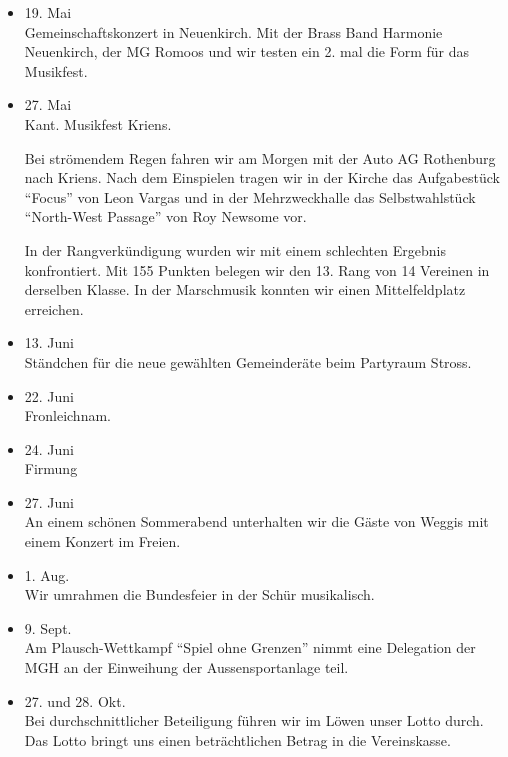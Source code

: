 \begin{history}
\begin{itemize}
        \item[]19. Mai\\
        Gemeinschaftskonzert in Neuenkirch. Mit der Brass Band Harmonie
        Neuenkirch, der MG Romoos und wir testen ein 2. mal die Form für das
        Musikfest.

        \item[]27. Mai\\
        Kant. Musikfest Kriens.

        Bei strömendem Regen fahren wir am Morgen mit der Auto AG Rothenburg
        nach Kriens. Nach dem Einspielen tragen wir in der Kirche das
        Aufgabestück \enquote{Focus} von Leon Vargas und in der Mehrzweckhalle
        das Selbstwahlstück \enquote{North-West Passage} von Roy Newsome vor.

        In der Rangverkündigung wurden wir mit einem schlechten Ergebnis
        konfrontiert. Mit 155 Punkten belegen wir den 13. Rang von 14 Vereinen
        in derselben Klasse. In der Marschmusik konnten wir einen
        Mittelfeldplatz erreichen.

        \item[]13. Juni\\
        Ständchen für die neue gewählten Gemeinderäte beim Partyraum Stross.

        \item[]22. Juni\\
        Fronleichnam.

        \item[]24. Juni\\
        Firmung

        \item[]27. Juni\\
        An einem schönen Sommerabend unterhalten wir die Gäste von Weggis mit
        einem Konzert im Freien.

        \item[]1. Aug.\\
        Wir umrahmen die Bundesfeier in der Schür musikalisch.

        \item[]9. Sept.\\
        Am Plausch-Wettkampf \enquote{Spiel ohne Grenzen} nimmt eine Delegation
        der MGH an der Einweihung der Aussensportanlage teil.

        \item[]27. und 28. Okt.\\
        Bei durchschnittlicher Beteiligung führen wir im Löwen unser Lotto
        durch. Das Lotto bringt uns einen beträchtlichen Betrag in die
        Vereinskasse.

    \end{itemize}

\end{history}
